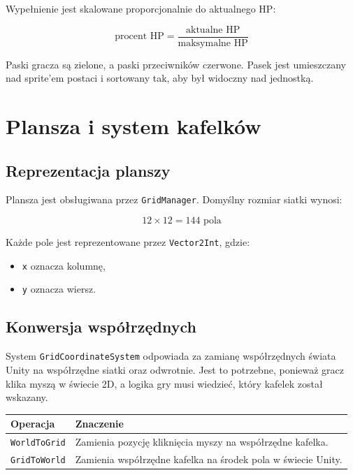 \documentclass[12pt,a4paper]{article}
\begin{document}
Wypełnienie jest skalowane proporcjonalnie do aktualnego HP:

\begin{equation}
    \text{procent HP} = \frac{\text{aktualne HP}}{\text{maksymalne HP}}
\end{equation}

Paski gracza są zielone, a paski przeciwników czerwone. Pasek jest umieszczany nad sprite'em postaci i sortowany tak, aby był widoczny nad jednostką.

\newpage

\section{Plansza i system kafelków}

\subsection{Reprezentacja planszy}

Plansza jest obsługiwana przez \texttt{GridManager}. Domyślny rozmiar siatki wynosi:

\begin{equation}
    12 \times 12 = 144 \text{ pola}
\end{equation}

Każde pole jest reprezentowane przez \texttt{Vector2Int}, gdzie:

\begin{itemize}
    \item \texttt{x} oznacza kolumnę,
    \item \texttt{y} oznacza wiersz.
\end{itemize}

\subsection{Konwersja współrzędnych}

System \texttt{GridCoordinateSystem} odpowiada za zamianę współrzędnych świata Unity na współrzędne siatki oraz odwrotnie. Jest to potrzebne, ponieważ gracz klika myszą w świecie 2D, a logika gry musi wiedzieć, który kafelek został wskazany.

\begin{longtable}{p{5cm} p{9cm}}
\toprule
\textbf{Operacja} & \textbf{Znaczenie} \\
\midrule
\endhead
\texttt{WorldToGrid} & Zamienia pozycję kliknięcia myszy na współrzędne kafelka. \\[4pt]
\texttt{GridToWorld} & Zamienia współrzędne kafelka na środek pola w świecie Unity. \\
\bottomrule
\end{longtable}
\end{document}
